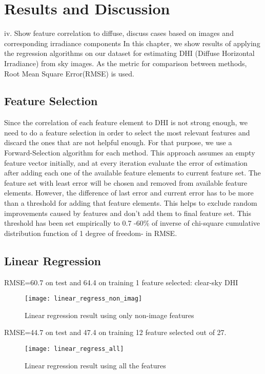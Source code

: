 \chapter{Results and Discussion}
iv.	Show feature correlation to diffuse, discuss cases based on images and corresponding irradiance components
In this chapter, we show results of applying the regression algorithms on our dataset for estimating DHI (Diffuse Horizontal Irradiance) from sky images. As the metric for comparison between methods, Root Mean Square Error(RMSE) is used. 

\section{Feature Selection}
Since the correlation of each feature element to DHI is not strong enough, we need to do a feature selection in order to select the most relevant features and discard the ones that are not helpful enough. For that purpose, we use a Forward-Selection algorithm for each method. This approach assumes an empty feature vector initially, and at every iteration evaluate the error of estimation after adding each one of the available feature elements to current feature set. The feature set with least error will be chosen and removed from available feature elements. However, the difference of last error and current error has to be more than a threshold for adding that feature elements. This helps to exclude random improvements caused by features and don't add them to final feature set. This threshold has been set empirically to 0.7 -60\% of inverse of chi-square cumulative distribution function of 1 degree of freedom- in RMSE.

\section{Linear Regression}

RMSE=60.7 on test and 64.4 on training
1 feature selected: clear-sky DHI

\begin{figure}[h]
\caption{Linear regression result using only non-image features}
\label{fig:ln_result_no_image}
\texttt{[image: linear\_regress\_non\_imag]}
\centering
\end{figure}

RMSE=44.7 on test and 47.4 on training
12 feature selected out of 27.

\begin{figure}[h]
\caption{Linear regression result using all the features}
\label{fig:ln_result_all}
\texttt{[image: linear\_regress\_all]}
\centering
\end{figure}

